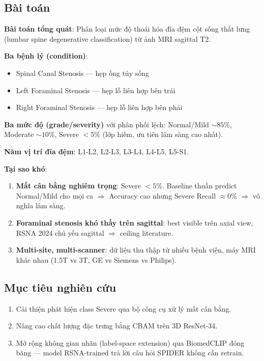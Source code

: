 \documentclass[11pt,a4paper]{article}
\begin{document}
\subsection{Bài toán}

\noindent\textbf{Bài toán tổng quát}: Phân loại mức độ thoái hóa đĩa đệm
cột sống thắt lưng (lumbar spine degenerative classification) từ ảnh
MRI sagittal T2.

\noindent\textbf{Ba bệnh lý (condition)}:
\begin{itemize}[leftmargin=*]
\item Spinal Canal Stenosis --- hẹp ống tủy sống
\item Left Foraminal Stenosis --- hẹp lỗ liên hợp bên trái
\item Right Foraminal Stenosis --- hẹp lỗ liên hợp bên phải
\end{itemize}

\noindent\textbf{Ba mức độ (grade/severity)} với phân phối lệch:
Normal/Mild $\sim 85\%$, Moderate $\sim 10\%$, Severe $<5\%$ (lớp hiếm,
ưu tiên lâm sàng cao nhất).

\noindent\textbf{Năm vị trí đĩa đệm}: L1-L2, L2-L3, L3-L4, L4-L5, L5-S1.

\noindent\textbf{Tại sao khó}:
\begin{enumerate}[leftmargin=*]
\item \textbf{Mất cân bằng nghiêm trọng}: Severe $<5\%$. Baseline thuần
predict Normal/Mild cho mọi ca $\Rightarrow$ Accuracy cao nhưng Severe
Recall $\approx 0\%$ $\Rightarrow$ vô nghĩa lâm sàng.
\item \textbf{Foraminal stenosis khó thấy trên sagittal}: best visible
trên axial view, RSNA 2024 chủ yếu sagittal $\Rightarrow$ ceiling
literature.
\item \textbf{Multi-site, multi-scanner}: dữ liệu thu thập từ nhiều
bệnh viện, máy MRI khác nhau (1.5T vs 3T, GE vs Siemens vs Philips).
\end{enumerate}

\subsection{Mục tiêu nghiên cứu}

\begin{enumerate}[leftmargin=*]
\item Cải thiện phát hiện class Severe qua bộ công cụ xử lý mất cân bằng.
\item Nâng cao chất lượng đặc trưng bằng CBAM trên 3D ResNet-34.
\item Mở rộng không gian nhãn (label-space extension) qua BiomedCLIP
đóng băng --- model RSNA-trained trả lời câu hỏi SPIDER không cần
retrain.
\end{enumerate}
\end{document}
